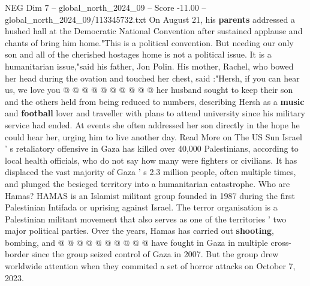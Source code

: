 \begin{textsample}{NEG Dim 7 – global\_north\_2024\_09 – Score -11.00 – global\_north\_2024\_09/113345732.txt}
On August 21, his \textbf{parents} addressed a hushed hall at the Democratic National Convention after sustained applause and chants of bring him home."This is a political convention.
But needing our only son and all of the cherished hostages home is not a political issue.
It is a humanitarian issue,"said his father, Jon Polin.
His mother, Rachel, who bowed her head during the ovation and touched her chest, said :"Hersh, if you can hear us, we love you @ @ @ @ @ @ @ @ @ @ her husband sought to keep their son and the others held from being reduced to numbers, describing Hersh as a \textbf{music} and \textbf{football} lover and traveller with plans to attend university since his military service had ended.
At events she often addressed her son directly in the hope he could hear her, urging him to live another day.
Read More on The US Sun Israel ' s retaliatory offensive in Gaza has killed over 40,000 Palestinians, according to local health officials, who do not say how many were fighters or civilians.
It has displaced the vast majority of Gaza ' s 2.3 million people, often multiple times, and plunged the besieged territory into a humanitarian catastrophe.
Who are Hamas?
HAMAS is an Islamist militant group founded in 1987 during the first Palestinian Intifada or uprising against Israel.
The terror organisation is a Palestinian militant movement that also serves as one of the territories ' two major political parties.
Over the years, Hamas has carried out \textbf{shooting}, bombing, and @ @ @ @ @ @ @ @ @ @ have fought in Gaza in multiple cross-border since the group seized control of Gaza in 2007.
But the group drew worldwide attention when they commited a set of horror attacks on October 7, 2023.

\end{textsample}
